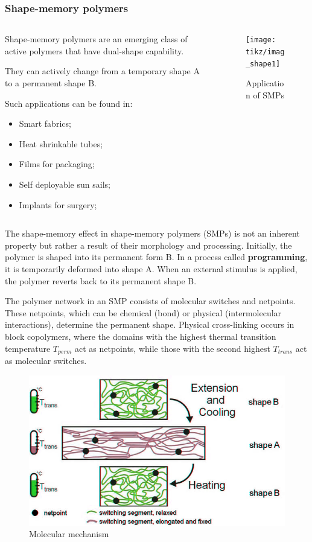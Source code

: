 \documentclass[10pt]{beamer}
\begin{document}
\begin{frame}[label=memory]
\frametitle{Shape-memory polymers {\tiny \cite{BEHL200720}}}

\begin{columns}
\begin{column}{0.5\textwidth}
Shape-memory polymers are an emerging class of active polymers that
have dual-shape capability. \newline

They can actively change from a temporary shape A to a permanent shape B. \newline

Such applications can be found in: 
\begin{itemize}
\item Smart fabrics;
\item Heat shrinkable tubes;
\item Films for packaging;
\item Self deployable sun sails;
\item Implants for surgery;
\end{itemize}
\end{column}

\begin{column}{0.5\textwidth}
\begin{figure}[H]
\centering
\texttt{[image: tikz/imag\_shape1]}
\caption{Application of SMPs}
\label{fig:imagshape1}
\end{figure}     
\end{column}		
\end{columns}
\end{frame}


\begin{frame}
\small
The shape-memory effect in shape-memory polymers (SMPs) is not an inherent property but rather a result of their morphology and processing. Initially, the polymer is shaped into its permanent form B. In a process called \textbf{programming}, it is temporarily deformed into shape A. When an external stimulus is applied, the polymer reverts back to its permanent shape B.

The polymer network in an SMP consists of molecular switches and netpoints. These netpoints, which can be chemical (bond) or physical (intermolecular interactions), determine the permanent shape. Physical cross-linking occurs in block copolymers, where the domains with the highest thermal transition temperature $T_{perm}$ act as netpoints, while those with the second highest $T_{trans}$ act as molecular switches.
\begin{figure}[H]
\centering
\includegraphics[width=0.5\linewidth]{figures/screenshot001}
\caption{Molecular mechanism}
\label{fig:screenshot001}
\end{figure}	
				
\end{frame}
\end{document}
